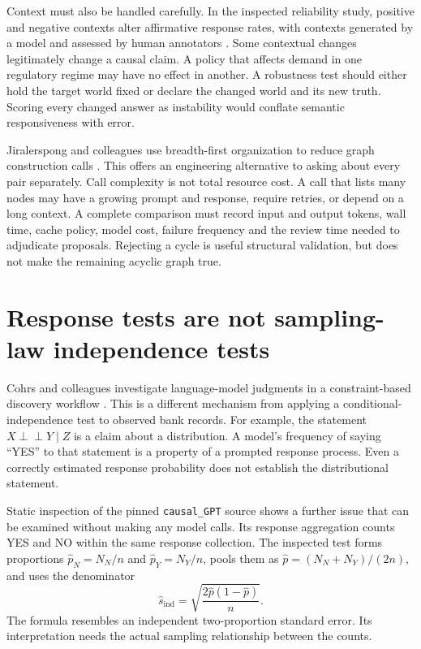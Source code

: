Context must also be handled carefully. In the inspected reliability study,
positive and negative contexts alter affirmative response rates, with contexts
generated by a model and assessed by human annotators
\cite{v12_la_2407_19638}. Some contextual changes legitimately change a causal
claim. A policy that affects demand in one regulatory regime may have no effect
in another. A robustness test should either hold the target world fixed or
declare the changed world and its new truth. Scoring every changed answer as
instability would conflate semantic responsiveness with error.

Jiralerspong and colleagues use breadth-first organization to reduce graph
construction calls \cite{v12_la_2402_01207}. This offers an engineering
alternative to asking about every pair separately. Call complexity is not total
resource cost. A call that lists many nodes may have a growing prompt and
response, require retries, or depend on a long context. A complete comparison
must record input and output tokens, wall time, cache policy, model cost,
failure frequency and the review time needed to adjudicate proposals. Rejecting
a cycle is useful structural validation, but does not make the remaining
acyclic graph true.

\section{Response tests are not sampling-law independence tests}

Cohrs and colleagues investigate language-model judgments in a
constraint-based discovery workflow \cite{v12_la_2406_07378}. This is a
different mechanism from applying a conditional-independence test to observed
bank records. For example, the statement
$X\mathrel{\perp\!\!\!\perp}Y\mid Z$ is a claim about a distribution. A
model's frequency of saying ``YES'' to that statement is a property of a
prompted response process. Even a correctly estimated response probability
does not establish the distributional statement.

Static inspection of the pinned \texttt{causal\_GPT} source shows a further
issue that can be examined without making any model calls. Its response
aggregation counts YES and NO within the same response collection. The
inspected test forms proportions $\widehat p_N=N_N/n$ and
$\widehat p_Y=N_Y/n$, pools them as
$\widehat p=(N_N+N_Y)/(2n)$, and uses the denominator
\begin{equation}
 \widehat s_{\mathrm{ind}}=
 \sqrt{\frac{2\widehat p(1-\widehat p)}{n}}.
 \label{eq:la03-independent-denominator}
\end{equation}
The formula resembles an independent two-proportion standard error. Its
interpretation needs the actual sampling relationship between the counts.

